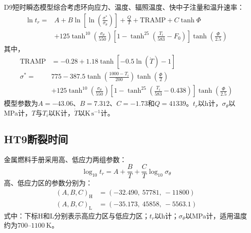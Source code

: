D9短时瞬态模型综合考虑环向应力、温度、辐照温度、快中子注量和温升速率\cite{FanningSAS4ASASSYS1Safety2017}：
\begin{equation}
	\label{eq:appendix_d9_transient_rupture_time}
	\begin{aligned}
		\ln t_r
		={}&A+B\ln\!\left[
		\ln\!\left(\frac{\sigma^*}{\sigma_\theta}\right)
		\right]
		+\frac{Q}{T}
		+\mathrm{TRAMP}
		+C\tanh\varPhi
		\\
		&+125\tanh^{10}\!\left(\frac{\sigma_\theta}{550}\right)
		\left[1-\tanh^{25}\!\left(\frac{T_i}{583}-F_0\right)\right]
		\tanh\!\left(\frac{\varPhi}{2.5}\right)
	\end{aligned}
\end{equation}
其中，
\begin{equation}
	\label{eq:appendix_d9_transient_auxiliary_functions}
	\begin{aligned}
		\mathrm{TRAMP}
		&=-0.28+1.18\tanh[-0.5\ln(\dot T)-1]\\
		\sigma^*
		={}&775-387.5
		\tanh\!\left(\frac{1000-T_i}{200}\right)
		\tanh\!\left(\frac{\varPhi}{2}
		\right)
		\\
		&+125\tanh^{10}\!\left(\frac{\sigma_\theta}{550}\right)
		\left[1-\tanh^{25}\!\left(\frac{T_i}{583}-0.438\right)\right]
		\tanh\!\left(\frac{\varPhi}{2.5}\right)
	\end{aligned}
\end{equation}
模型参数为$A=-43.06$、$B=7.312$、$C=-1.73$和$Q=41339$。$t_r$以h计，$\sigma_\theta$以MPa计，$T$与$T_i$以K计，$\dot T$以$\mathrm{K\,s^{-1}}$计。

\subsection{HT9断裂时间}

金属燃料手册采用高、低应力两组参数：
\begin{equation}
	\log_{10}t_r
	=A+\frac{B}{T}
	+\frac{C}{T}\log_{10}\sigma_\theta
	\label{eq:appendix_ht9_mfh_rupture_time}
\end{equation}
高、低应力区的参数分别为：
\begin{equation}
	\label{eq:appendix_ht9_mfh_rupture_parameters}
	\begin{aligned}
		(A,B,C)_{\mathrm H}
		&=(-32.490,\ 57781,\ -11800)\\
		(A,B,C)_{\mathrm L}
		&=(-35.173,\ 45858,\ -5563.1)
	\end{aligned}
\end{equation}
\noindent 式中：下标$\mathrm H$和$\mathrm L$分别表示高应力区与低应力区；$t_r$以h计；$\sigma_\theta$以MPa计，适用温度约为$700$--$1100\ \mathrm{K}$。

